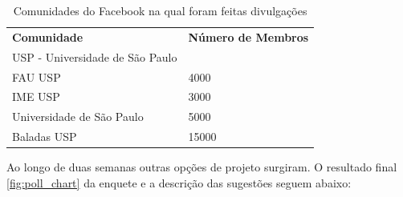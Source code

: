 \begin{table}[]
\centering
\caption{Comunidades do Facebook na qual foram feitas divulgações}
\label{my-label}
\begin{tabular}{ll}
{\color[HTML]{3531FF} \textbf{Comunidade}} & {\color[HTML]{3531FF} \textbf{Número de Membros}} \\
USP - Universidade de São Paulo            &                                                   \\
FAU USP                                    & 4000                                              \\
IME USP                                    & 3000                                              \\
Universidade de São Paulo                  & 5000                                              \\
Baladas USP                                & 15000                                            
\end{tabular}
\end{table}
\par Ao longo de duas semanas outras opções de projeto surgiram. O resultado final \ref{fig:poll_chart} da enquete e a descrição das sugestões seguem abaixo:
